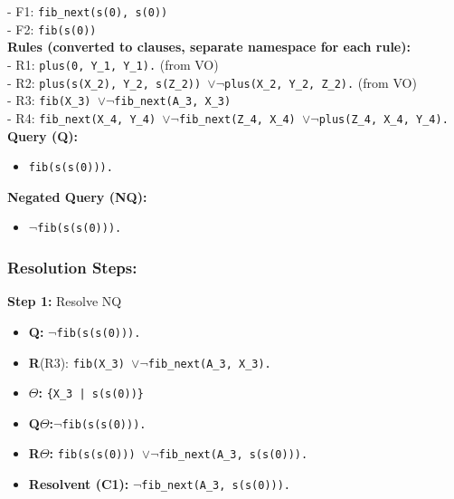 \documentclass[10pt, a4paper]{article}
\begin{document}
- F1: \texttt{fib\_next(s(0), s(0))}\\
- F2: \texttt{fib(s(0))} \\

\textbf{Rules (converted to clauses, separate namespace for each rule):}\\

- R1: \texttt{plus(0, Y\_1, Y\_1).} (from VO)\\
- R2: \texttt{plus(s(X\_2), Y\_2, s(Z\_2)) $\lor \lnot$plus(X\_2, Y\_2, Z\_2).} (from VO)\\
- R3: \texttt{fib(X\_3) $\lor \lnot$fib\_next(A\_3, X\_3)}\\
- R4: \texttt{fib\_next(X\_4, Y\_4) $\lor \lnot$fib\_next(Z\_4, X\_4) $\lor \lnot$plus(Z\_4, X\_4, Y\_4).}\\

\textbf{Query (Q):}
\begin{itemize}
    \item \texttt{fib(s(s(0))).}
\end{itemize}

\textbf{Negated Query (NQ):}
\begin{itemize}
    \item \texttt{$\lnot$fib(s(s(0))).}
\end{itemize}

\subsubsection*{Resolution Steps:}

\textbf{Step 1:} Resolve NQ
\begin{itemize}
    \item \textbf{Q:} \texttt{$\lnot$fib(s(s(0))).}
    \item \textbf{R}(R3): \texttt{fib(X\_3) $\lor \lnot$fib\_next(A\_3, X\_3).}
    \item \textbf{$\Theta$:} \texttt{\{X\_3 | s(s(0))\}}
    \item \textbf{Q$\Theta$:}\texttt{$\lnot$fib(s(s(0))).}
    \item \textbf{R$\Theta$:} \texttt{fib(s(s(0))) $\lor \lnot$fib\_next(A\_3, s(s(0))).}
    \item \textbf{Resolvent (C1):} \texttt{$\lnot$fib\_next(A\_3, s(s(0))).}\\
\end{itemize}
\end{document}
